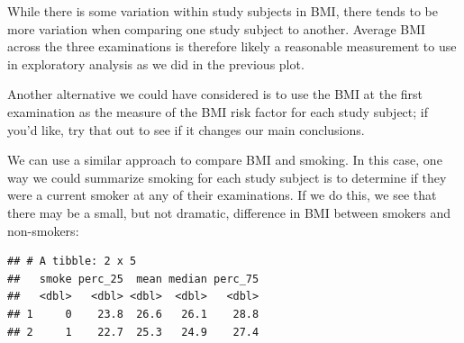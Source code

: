 \documentclass[
]{book}
\newenvironment{Shaded}{\begin{snugshade}}{\end{snugshade}}
\newcommand{\DataTypeTok}[1]{\textcolor[rgb]{0.13,0.29,0.53}{#1}}
\newcommand{\FloatTok}[1]{\textcolor[rgb]{0.00,0.00,0.81}{#1}}
\newcommand{\KeywordTok}[1]{\textcolor[rgb]{0.13,0.29,0.53}{\textbf{#1}}}
\newcommand{\NormalTok}[1]{#1}
\newcommand{\OperatorTok}[1]{\textcolor[rgb]{0.81,0.36,0.00}{\textbf{#1}}}
\newcommand{\OtherTok}[1]{\textcolor[rgb]{0.56,0.35,0.01}{#1}}
\newcommand{\StringTok}[1]{\textcolor[rgb]{0.31,0.60,0.02}{#1}}
\begin{document}
While there is some variation within study subjects in BMI, there tends to be more variation when comparing one study subject to another. Average BMI across the three examinations is therefore likely a reasonable measurement to use in exploratory analysis as we did in the previous plot.

Another alternative we could have considered is to use the BMI at the first examination as the measure of the BMI risk factor for each study subject; if you'd like, try that out to see if it changes our main conclusions.

We can use a similar approach to compare BMI and smoking. In this case, one way we could summarize smoking for each study subject is to determine if they were a current smoker at any of their examinations. If we do this, we see that there may be a small, but not dramatic, difference in BMI between smokers and non-smokers:

\begin{Shaded}
\end{Shaded}

\begin{verbatim}
## # A tibble: 2 x 5
##   smoke perc_25  mean median perc_75
##   <dbl>   <dbl> <dbl>  <dbl>   <dbl>
## 1     0    23.8  26.6   26.1    28.8
## 2     1    22.7  25.3   24.9    27.4
\end{verbatim}
\end{document}
